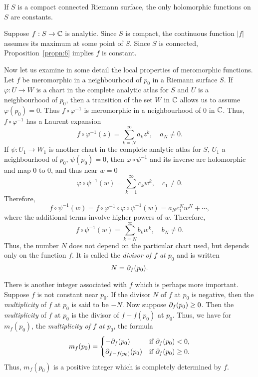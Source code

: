 \documentclass[a4paper,11pt]{article}
\begin{document}
\begin{propn}
  \label{propn:8}
  If $S$ is a compact connected Riemann surface, the only holomorphic
  functions on $S$ are constants.
\end{propn}
\begin{myproof}
  Suppose $f : S \to {\mathbb C}$ is analytic.  Since $S$ is compact, the
  continuous function $|f|$ assumes its maximum at some point of $S$.
  Since $S$ is connected, Proposition~\ref{propn:6} implies $f$ is
  constant.
\end{myproof}

Now let us examine in some detail the local properties of meromorphic
functions.  Let $f$ be meromorphic in a neighbourhood of $p_0$ in a
Riemann surface $S$.  If $\varphi : U \to W$ is a chart in the
complete analytic atlas for $S$ and $U$ is a neighbourhood of $p_0$,
then a transition of the set $W$  in ${\mathbb C}$ allows us to assume
$\varphi(p_0) = 0$.  Thus $f\circ \varphi^{-1}$ is meromorphic in a
neighbourhood of 0 in ${\mathbb C}$.  Thus, $f\circ \varphi^{-1}$ has a
Laurent expansion
$$
f \circ \varphi^{-1}(z) = \sum_{k=N}^{\infty} a_k z^k,\quad a_N \ne 0.
$$
If $\psi : U_1 \to W_1$ is another chart in the complete analytic
atlas for $S$, $U_1$ a neighbourhood of $p_0$, $\psi(p_0) = 0$, then
$\varphi \circ \psi^{-1}$ and its inverse are holomorphic and map 0 to
0, and thus near $w = 0$
$$
\varphi \circ \psi^{-1}(w) = \sum_{k=1}^{\infty} c_k w^k,\quad c_1 \ne 0.
$$
Therefore,
$$
f \circ \psi^{-1}(w) = f\circ \varphi^{-1} \circ \varphi \circ
\psi^{-1}(w) = a_N c_1^N w^N + \cdots,
$$
where the additional terms involve higher powers of $w$.  Therefore,
$$
f \circ \psi^{-1}(w) = \sum_{k=N}^{\infty} b_kw^k,\quad b_N \ne 0.
$$
Thus, the number $N$ does not depend on the particular chart used, but
depends only on the function $f$.  It is called the \emph{divisor of
  $f$ at $p_0$} and is written
$$
N = \partial_f(p_0).
$$

There is another integer associated with $f$ which is perhaps more
important.  Suppose $f$ is not constant near $p_0$.  If the divisor
$N$ of $f$ at $p_0$ is negative, then the \emph{multiplicity} of $f$
at $p_0$ is said to be $-N$.  Now suppose $\partial_f(p_0) \ge 0$.  Then the
\emph{multiplicity} of $f$ at $p_0$ is the divisor of $f-f(p_0)$ at
$p_0$.  Thus, we have for $m_f(p_0)$, the \emph{multiplicity of $f$ at
$p_0$}, the formula
$$
m_f(p_0) =
\begin{cases}
  -\partial_f(p_0) & \text{if }\partial_f(p_0) < 0,\\
  \partial_{f-f(p_0)}(p_0) & \text{if }\partial_f(p_0) \ge 0.
\end{cases}
$$
Thus, $m_f(p_0)$ is a positive integer which is completely determined
by $f$.
\end{document}
